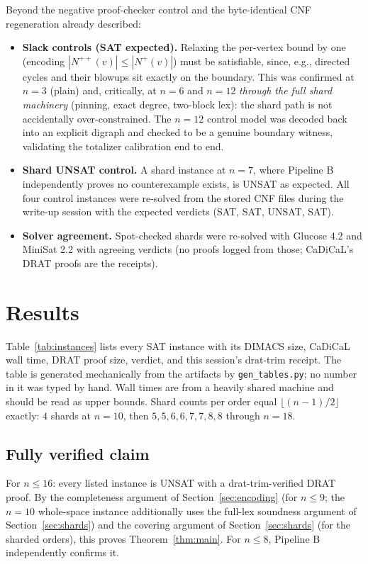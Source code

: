 \documentclass[11pt]{article}
\newcommand{\Nout}{N^{+}}
\newcommand{\Nsec}{N^{++}}
\begin{document}
Beyond the negative proof-checker control and the byte-identical CNF
regeneration already described:
\begin{itemize}
\item \textbf{Slack controls (SAT expected).} Relaxing the per-vertex bound
by one (encoding $|\Nsec(v)| \le |\Nout(v)|$) must be satisfiable, since,
e.g., directed cycles and their blowups sit exactly on the boundary. This
was confirmed at $n = 3$ (plain) and, critically, at $n = 6$ and $n = 12$
\emph{through the full shard machinery} (pinning, exact degree, two-block
lex): the shard path is not accidentally over-constrained. The $n = 12$
control model was decoded back into an explicit digraph and checked to be a
genuine boundary witness, validating the totalizer calibration end to end.
\item \textbf{Shard UNSAT control.} A shard instance at $n = 7$, where
Pipeline B independently proves no counterexample exists, is UNSAT as
expected. All four control instances were re-solved from the stored CNF
files during the write-up session with the expected verdicts
(SAT, SAT, UNSAT, SAT).
\item \textbf{Solver agreement.} Spot-checked shards were re-solved with
Glucose 4.2 and MiniSat 2.2 with agreeing verdicts (no proofs logged from
those; CaDiCaL's DRAT proofs are the receipts).
\end{itemize}

\section{Results}\label{sec:results}

Table~\ref{tab:instances} lists every SAT instance with its DIMACS size,
CaDiCaL wall time, DRAT proof size, verdict, and this session's drat-trim
receipt. The table is generated mechanically from the artifacts by
\texttt{gen\_tables.py}; no number in it was typed by hand.
Wall times are from a heavily shared machine and should be read as upper
bounds. Shard counts per order equal $\lfloor (n-1)/2 \rfloor$ exactly:
$4$ shards at $n=10$, then $5,5,6,6,7,7,8,8$ through $n=18$.



\subsection{Fully verified claim}

For $n \le 16$: every listed instance is UNSAT with a drat-trim-verified
DRAT proof. By the completeness argument of Section~\ref{sec:encoding}
(for $n \le 9$; the $n = 10$ whole-space instance additionally uses the
full-lex soundness argument of Section~\ref{sec:shards}) and the covering
argument of Section~\ref{sec:shards} (for the sharded orders), this proves
Theorem~\ref{thm:main}. For $n \le 8$, Pipeline B independently confirms
it.
\end{document}
